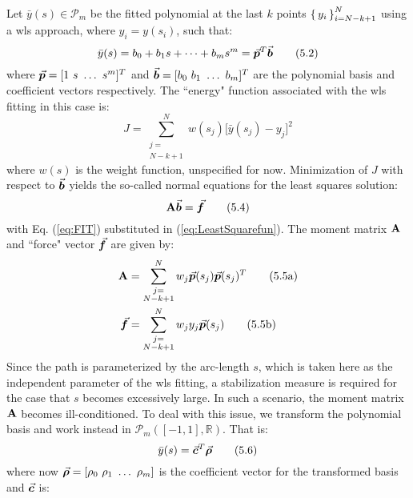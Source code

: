 Let $\bar{y}(s)\in\mathcal{P}_m$ be the fitted polynomial at the last $k$ points
$\set{y_i}_{i=N-k+1}^N$ using a \acrshort{wls} approach, where $y_i=y(s_i)$, 
such that:
\begin{equation}
	\bar{y}(s) = b_0+b_1s+\cdots +b_ms^m=\vec{\bm{p}}^T\vec{\bm{b}}
	\tag{5.2}\label{eq:FIT}
\end{equation}
where $\vec{\bm{p}}=[1\ s\ \dots\ s^m]^T$ and $\vec{\bm{b}}=[b_0\ b_1\ \dots\ b_m]^T$ 
are the polynomial basis and coefficient vectors respectively. 
The ``energy" function associated with the \acrshort{wls} fitting in this case 
is:
\begin{equation}
	J = \sum_{\substack{j=\\ N-k+1}}^N w(s_j)\bigg[\bar{y}(s_j)-y_j\bigg]^2
	\tag{5.3}\label{eq:LeastSquarefun}
\end{equation}
where $w(s)$ is the weight function, unspecified for now. Minimization of $J$ 
with respect to $\vec{\bm{b}}$ yields the so-called normal equations for the least
squares solution: 
\begin{equation}
	\mathbf{A}\vec{\bm{b}}=\vec{\bm{f}}
	\tag{5.4}\label{eq:NORMAL}
\end{equation}
with Eq. (\ref{eq:FIT}) substituted in (\ref{eq:LeastSquarefun}). The moment
matrix $\mathbf{A}$ and ``force" vector $\vec{\bm{f}}$ are given by:
\begin{subequations}
	\begin{align}
		\mathbf{A} &= \sum_{\substack{j=\\ N-k+1}}^N 
		w_j\vec{\bm{p}}(s_j)\vec{\bm{p}}(s_j)^T\tag{5.5a}\label{eq:moment}\\ 
		\vec{\bm{f}} &= \sum_{\substack{j=\\ N-k+1}}^N 
		w_jy_j\vec{\bm{p}}(s_j)\tag{5.5b}\label{eq:force}
	\end{align}
\end{subequations}
Since the path is
parameterized by the arc-length $s$, which is taken here as the independent
parameter of the \acrshort{wls} fitting, a stabilization measure is required 
for the case
that $s$ becomes excessively large. In such a scenario, the moment matrix
$\mathbf{A}$ becomes ill-conditioned. To deal with this issue, we transform the 
polynomial basis and work instead in $\mathcal{P}_m([-1,1],\mathbb{R})$. 
That is:
\begin{equation}
	\bar{y}(s) = \vec{\bm{c}}^T\vec{\bm{\rho}}
	\tag{5.6}\label{eq:TFIT}
\end{equation}
where now $\vec{\bm{\rho}}=[\rho_0\ \rho_1\ \dots\ \rho_m]$ is the coefficient 
vector for the
transformed basis and $\vec{\bm{c}}$ is:
